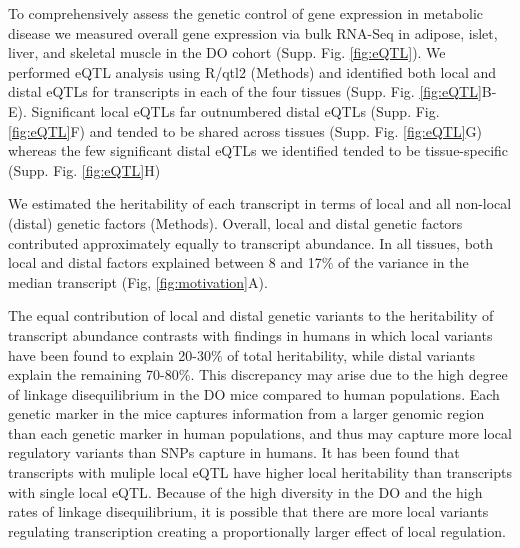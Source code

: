 \documentclass[
]{article}
\begin{document}
To comprehensively assess the genetic control of gene expression in
metabolic disease we measured overall gene expression via bulk RNA-Seq
in adipose, islet, liver, and skeletal muscle in the DO cohort (Supp.
Fig. \ref{fig:eQTL}). We performed eQTL analysis using R/qtl2
\cite{pmid30591514} (Methods) and identified both local and distal eQTLs
for transcripts in each of the four tissues (Supp. Fig.
\ref{fig:eQTL}B-E). Significant local eQTLs far outnumbered distal eQTLs
(Supp. Fig. \ref{fig:eQTL}F) and tended to be shared across tissues
(Supp. Fig. \ref{fig:eQTL}G) whereas the few significant distal eQTLs we
identified tended to be tissue-specific (Supp. Fig. \ref{fig:eQTL}H)

We estimated the heritability of each transcript in terms of local and
all non-local (distal) genetic factors (Methods). Overall, local and
distal genetic factors contributed approximately equally to transcript
abundance. In all tissues, both local and distal factors explained
between 8 and 17\% of the variance in the median transcript (Fig,
\ref{fig:motivation}A).

The equal contribution of local and distal genetic variants to the
heritability of transcript abundance contrasts with findings in humans
in which local variants have been found to explain 20-30\% of total
heritability, while distal variants explain the remaining
70-80\%\cite{pmid31558840, pmid21383966}. This discrepancy may arise due
to the high degree of linkage disequilibrium in the DO mice compared to
human populations. Each genetic marker in the mice captures information
from a larger genomic region than each genetic marker in human
populations, and thus may capture more local regulatory variants than
SNPs capture in humans. It has been found that transcripts with muliple
local eQTL have higher local heritability than transcripts with single
local eQTL\cite{pmid25010687}. Because of the high diversity in the DO
and the high rates of linkage disequilibrium, it is possible that there
are more local variants regulating transcription creating a
proportionally larger effect of local regulation.
\end{document}
